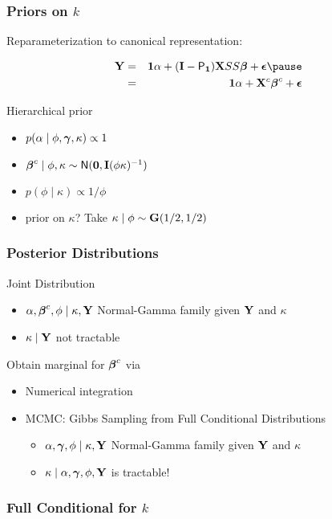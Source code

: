 \documentclass[]{beamer}
\begin{document}
\begin{frame}
  \frametitle{Priors on $k$}
  Reparameterization to canonical representation:

  \begin{eqnarray*}
  \Y  & =  &\one \alpha + (\I - \P_{\one}) \X S S \b +
  \eps   \pause \\
      & = & \one \alpha + \X^c \b^c + \eps
  \end{eqnarray*}

Hierarchical prior \pause
\begin{itemize}
\item $p(\alpha \mid \phi, \boldsymbol{\gamma}, \kappa) \propto 1$ \pause
\item $\boldsymbol{\beta}^c \mid \phi, \kappa \sim \textsf{N}(\mathbf{0}, \mathbf{I} (\phi \kappa )^{-1})$ \pause
\item $p(\phi \mid \kappa) \propto 1/\phi$ \pause
\item prior on $\kappa$?  Take $\kappa \mid \phi \sim  \mathbf{G}(1/2, 1/2)$ 
\end{itemize}
\end{frame}
\begin{frame}
  \frametitle{Posterior Distributions}
Joint Distribution
  \begin{itemize}
  \item $\alpha, \boldsymbol{\beta}^c, \phi \mid \kappa, \mathbf{Y}$  Normal-Gamma family given $\mathbf{Y}$
    and $\kappa$ \pause
  \item $\kappa \mid \mathbf{Y}$  not tractable \pause
  \end{itemize}
Obtain marginal for  $\boldsymbol{\beta}^c$ via  \pause
\begin{itemize}
\item Numerical integration \pause
\item MCMC: Gibbs Sampling from Full Conditional  Distributions
  \begin{itemize}
  \item $\alpha, \boldsymbol{\gamma}, \phi \mid \kappa, \mathbf{Y}$  Normal-Gamma family given $\mathbf{Y}$
    and $\kappa$ \pause
  \item $\kappa \mid \alpha, \boldsymbol{\gamma}, \phi, \mathbf{Y}$  is tractable! 
  \end{itemize}
\end{itemize}
\end{frame}

\begin{frame}
  \frametitle{Full Conditional for $k$}
  
\end{frame}
\end{document}
